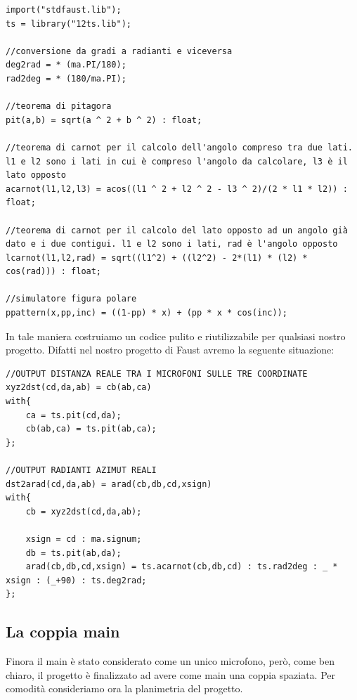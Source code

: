 \documentclass{article}
\begin{document}
    
    \begin{lstlisting}
import("stdfaust.lib");
ts = library("12ts.lib");

//conversione da gradi a radianti e viceversa
deg2rad = * (ma.PI/180);
rad2deg = * (180/ma.PI);

//teorema di pitagora
pit(a,b) = sqrt(a ^ 2 + b ^ 2) : float;

//teorema di carnot per il calcolo dell'angolo compreso tra due lati. l1 e l2 sono i lati in cui è compreso l'angolo da calcolare, l3 è il lato opposto
acarnot(l1,l2,l3) = acos((l1 ^ 2 + l2 ^ 2 - l3 ^ 2)/(2 * l1 * l2)) : float;

//teorema di carnot per il calcolo del lato opposto ad un angolo già dato e i due contigui. l1 e l2 sono i lati, rad è l'angolo opposto
lcarnot(l1,l2,rad) = sqrt((l1^2) + ((l2^2) - 2*(l1) * (l2) * cos(rad))) : float;

//simulatore figura polare
ppattern(x,pp,inc) = ((1-pp) * x) + (pp * x * cos(inc));
    \end{lstlisting}
    
    
    In tale maniera costruiamo un codice pulito e riutilizzabile per qualsiasi nostro progetto.
    Difatti nel nostro progetto di Faust avremo la seguente situazione:
    
    \begin{lstlisting}
//OUTPUT DISTANZA REALE TRA I MICROFONI SULLE TRE COORDINATE
xyz2dst(cd,da,ab) = cb(ab,ca)
with{
    ca = ts.pit(cd,da);
    cb(ab,ca) = ts.pit(ab,ca);
};

//OUTPUT RADIANTI AZIMUT REALI
dst2arad(cd,da,ab) = arad(cb,db,cd,xsign)
with{
    cb = xyz2dst(cd,da,ab);

    xsign = cd : ma.signum;
    db = ts.pit(ab,da);
    arad(cb,db,cd,xsign) = ts.acarnot(cb,db,cd) : ts.rad2deg : _ * xsign : (_+90) : ts.deg2rad;
};
    \end{lstlisting}

    \subsection{La coppia main}
    
    Finora il main è stato considerato come un unico microfono, però, come ben chiaro, il progetto è finalizzato ad avere come main una coppia spaziata. Per comodità consideriamo ora la planimetria del progetto.
\end{document}
